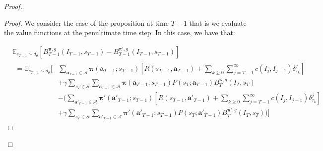 \documentclass{article}
\begin{document}
\begin{proof}
\begin{proof}
We consider the case of the proposition at time $ T-1$ that is we evaluate the value functions at the penultimate time step. In this case, we have that:

\begin{align}\nonumber
&\mathbb{E}_{s_{T-1}\sim d_\theta}\left[B^{\boldsymbol{\pi},g}_{T-1}(I_{T-1},s_{T-1})-B^{\boldsymbol{\pi'},g}_{T-1}(I_{T-1},s_{T-1})\right]
\\&\begin{aligned}=\mathbb{E}_{s_{T-1}\sim d_\theta}\Bigg[&\sum_{\boldsymbol{a}_{T-1}\in\boldsymbol{\mathcal{A}}}\boldsymbol{\pi}(\boldsymbol{a}_{T-1};s_{T-1})\left[
R(s_{T-1},\boldsymbol{a}_{T-1})+\sum_{k\geq 0}\sum_{j= T-1}^\infty c(I_j,I_{j-1})\delta^j_{\tau_k}\right]
\\&+\gamma\sum_{s_T\in S}\sum_{\boldsymbol{a}_{T-1}\in\boldsymbol{\mathcal{A}}}\boldsymbol{\pi}(\boldsymbol{a}_{T-1};s_{T-1}) P(s_T;\boldsymbol{a}_{T-1})B^{\boldsymbol{\pi},g}_{T}(I_{T},s_{T})
\\&\nonumber-\Bigg(
\sum_{\boldsymbol{a'}_{T-1}\in\boldsymbol{\mathcal{A}}}\boldsymbol{\pi'}(\boldsymbol{a'}_{T-1};s_{T-1})\left[
R(s_{T-1},\boldsymbol{a'}_{T-1})+\sum_{k\geq 0}\sum_{j= T-1}^\infty c(I_j,I_{j-1})\delta^j_{\tau_k}\right]
\\&+\gamma\sum_{s_T\in S}\sum_{\boldsymbol{a'}_{T-1}\in\boldsymbol{\mathcal{A}}}\boldsymbol{\pi'}(\boldsymbol{a'}_{T-1};s_{T-1}) P(s_T;\boldsymbol{a'}_{T-1})B^{\boldsymbol{\pi'},g}_{T}(I_{T},s_{T})\Bigg)\Bigg]

\end{aligned}
\end{align}
\end{proof}
\end{proof}
\end{document}
